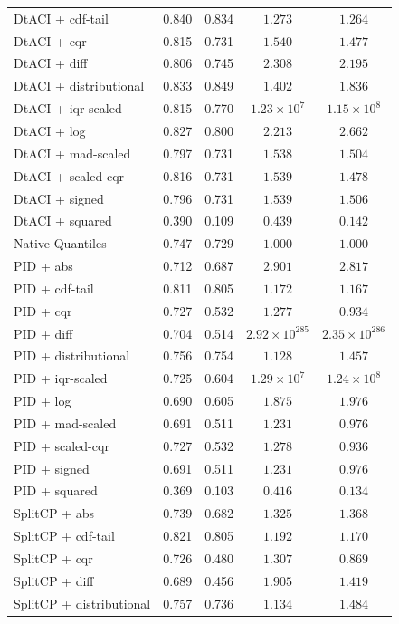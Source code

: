 \begin{longtable}{lcccc}
	DtACI + cdf-tail & 0.840 & 0.834 & $1.273$ & $1.264$ \\
	DtACI + cqr & 0.815 & 0.731 & $1.540$ & $1.477$ \\
	DtACI + diff & 0.806 & 0.745 & $2.308$ & $2.195$ \\
	DtACI + distributional & 0.833 & 0.849 & $1.402$ & $1.836$ \\
	DtACI + iqr-scaled & 0.815 & 0.770 & $1.23 \times 10^{7}$ & $1.15 \times 10^{8}$ \\
	DtACI + log & 0.827 & 0.800 & $2.213$ & $2.662$ \\
	DtACI + mad-scaled & 0.797 & 0.731 & $1.538$ & $1.504$ \\
	DtACI + scaled-cqr & 0.816 & 0.731 & $1.539$ & $1.478$ \\
	DtACI + signed & 0.796 & 0.731 & $1.539$ & $1.506$ \\
	DtACI + squared & 0.390 & 0.109 & $0.439$ & $0.142$ \\
	Native Quantiles & 0.747 & 0.729 & $1.000$ & $1.000$ \\
	PID + abs & 0.712 & 0.687 & $2.901$ & $2.817$ \\
	PID + cdf-tail & 0.811 & 0.805 & $1.172$ & $1.167$ \\
	PID + cqr & 0.727 & 0.532 & $1.277$ & $0.934$ \\
	PID + diff & 0.704 & 0.514 & $2.92 \times 10^{285}$ & $2.35 \times 10^{286}$ \\
	PID + distributional & 0.756 & 0.754 & $1.128$ & $1.457$ \\
	PID + iqr-scaled & 0.725 & 0.604 & $1.29 \times 10^{7}$ & $1.24 \times 10^{8}$ \\
	PID + log & 0.690 & 0.605 & $1.875$ & $1.976$ \\
	PID + mad-scaled & 0.691 & 0.511 & $1.231$ & $0.976$ \\
	PID + scaled-cqr & 0.727 & 0.532 & $1.278$ & $0.936$ \\
	PID + signed & 0.691 & 0.511 & $1.231$ & $0.976$ \\
	PID + squared & 0.369 & 0.103 & $0.416$ & $0.134$ \\
	SplitCP + abs & 0.739 & 0.682 & $1.325$ & $1.368$ \\
	SplitCP + cdf-tail & 0.821 & 0.805 & $1.192$ & $1.170$ \\
	SplitCP + cqr & 0.726 & 0.480 & $1.307$ & $0.869$ \\
	SplitCP + diff & 0.689 & 0.456 & $1.905$ & $1.419$ \\
	SplitCP + distributional & 0.757 & 0.736 & $1.134$ & $1.484$ \\

\end{longtable}

